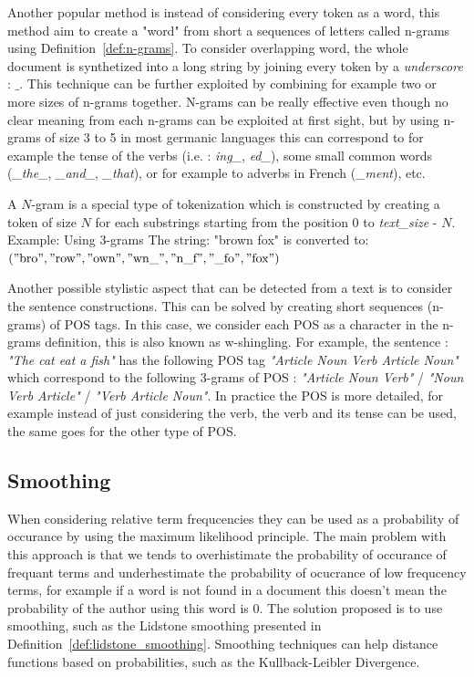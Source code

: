 Another popular method is instead of considering every token as a word, this method aim to create a "word" from short a sequences of letters called n-grams using Definition~\ref{def:n-grams}.
To consider overlapping word, the whole document is synthetized into a long string by joining every token by a \textit{underscore} : $\_$.
This technique can be further exploited by combining for example two or more sizes of n-grams together.
N-grams can be really effective even though no clear meaning from each n-grams can be exploited at first sight, but by using n-grams of size 3 to 5 in most germanic languages this can correspond to for example the tense of the verbs (i.e. : \textit{ing\_}, \textit{ed\_}), some small common words (\textit{\_the\_}, \textit{\_and\_}, \textit{\_that}), or for example to adverbs in French (\textit{\_ment}), etc.

\begin{definition}[$n$-grams]
  \label{def:n-grams}
  A $N$-gram is a special type of tokenization which is constructed by creating a token of size $N$ for each substrings starting from the position $0$ to \textit{text\_size} - $N$.
  Example: Using 3-grams The string: "brown fox" is converted to: \\
  $("\text{bro}", "\text{row}", "\text{own}", "\text{wn\_}", "\text{n\_f}", "\text{\_fo}", "\text{fox}")$
\end{definition}

Another possible stylistic aspect that can be detected from a text is to consider the sentence constructions.
This can be solved by creating short sequences (n-grams) of POS tags.
In this case, we consider each POS as a character in the n-grams definition, this is also known as w-shingling.
For example, the sentence : \textit{"The cat eat a fish"} has the following POS tag \textit{"Article Noun Verb Article Noun"} which correspond to the following 3-grams of POS : \textit{"Article Noun Verb"} / \textit{"Noun Verb Article"} / \textit{"Verb Article Noun"}.
In practice the POS is more detailed, for example instead of just considering the verb, the verb and its tense can be used, the same goes for the other type of POS.

\subsection{Smoothing}

When considering relative term frequcencies they can be used as a probability of occurance by using the maximum likelihood principle.
The main problem with this approach is that we tends to overhistimate the probability of occurance of frequant terms and underhestimate the probability of ocucrance of low frequcency terms, for example if a word is not found in a document this doesn't mean the probability of the author using this word is 0.
The solution proposed is to use smoothing, such as the Lidstone smoothing presented in Definition~\ref{def:lidstone_smoothing}.
Smoothing techniques can help distance functions based on probabilities, such as the Kullback-Leibler Divergence.

